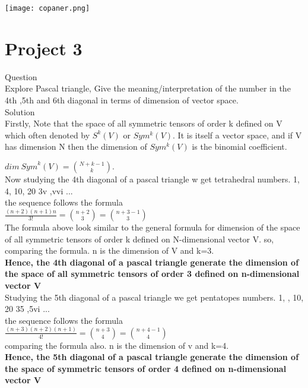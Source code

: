 \documentclass[45pt]{article}
\begin{document}
\texttt{[image: copaner.png]}
\vspace{4.0cm}

\section*{\Huge{Project 3}}
\Large{Question}\\
Explore Pascal triangle, Give the meaning/interpretation of the number in the 4th ,5th and 6th diagonal in terms of dimension of vector space.\\

\Large{Solution}\\
Firstly, Note that the space of all symmetric tensors of order k defined on V which often denoted by $S^k(V)$ or $Sym^k(V)$. It is itself a vector space, and if V has dimension N then the dimension of $Sym^k(V)$ is the binomial coefficient.

$dim~ {Sym}^{k}(V)={N+k-1 \choose k}.$\\

Now studying the 4th diagonal of a pascal triangle w get tetrahedral numbers. 
1, 4, 10, 20 3v ,vvi ...\\
the sequence follows the formula \\
$\frac{(n+2)(n+1)n}{3!} = {n+2 \choose 3} = {n+3-1 \choose 3}$\\
The formula above look similar to the general formula for dimension of the space of all symmetric tensors of order k defined on N-dimensional vector V.
so, comparing the formula.
n is the dimension of V and k=3.\\
\textbf{Hence, the 4th diagonal of a pascal triangle generate 
the dimension of the space of all symmetric tensors of order 3 defined on n-dimensional vector V}\\

Studying the 5th diagonal of a pascal triangle we get pentatopes numbers. 
1, , 10, 20 35 ,5vi ...\\
the sequence follows the formula \\
$\frac{(n+3)(n+2)(n+1)}{4!} = {n+3 \choose 4} = {n+4-1 \choose 4}$\\
comparing the formula also.
n is the dimension of v and k=4.\\
\textbf{Hence, the 5th diagonal of a pascal triangle generate the dimension of the space of symmetric tensors of order 4 defined on n-dimensional vector V}\\
\vspace{3.0cm}
   
\end{document}
